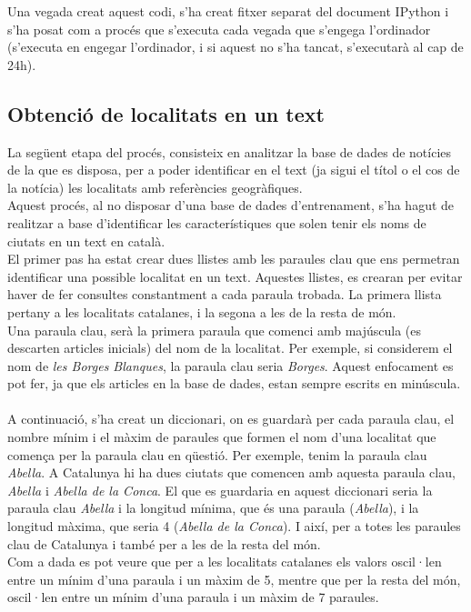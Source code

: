 \documentclass[12pt,a4paper,openright,oneside]{article}
\numberwithin{equation}{section}
\theoremstyle{definition}
\begin{document}
Una vegada creat aquest codi, s'ha creat fitxer separat del document IPython i s'ha posat com a procés que s'executa cada vegada que s'engega l'ordinador (s'executa en engegar l'ordinador, i si aquest no s'ha tancat, s'executarà al cap de 24h).

\subsection{Obtenció de localitats en un text}
La següent etapa del procés, consisteix en analitzar la base de dades de notícies de la que es disposa, per a poder identificar en el text (ja sigui el títol o el cos de la notícia) les localitats amb referències geogràfiques.\\
Aquest procés, al no disposar d'una base de dades d'entrenament, s'ha hagut de realitzar a base d'identificar les característiques que solen tenir els noms de ciutats en un text en català.\\
El primer pas ha estat crear dues llistes amb les paraules clau que ens permetran identificar una possible localitat en un text. Aquestes llistes, es crearan per evitar haver de fer consultes constantment a cada paraula trobada. La primera llista pertany a les localitats catalanes, i la segona a les de la resta de món.\\
Una paraula clau, serà la primera paraula que comenci amb majúscula (es descarten articles inicials) del nom de la localitat. Per exemple, si considerem el nom de \emph{les Borges Blanques}, la paraula clau seria \emph{Borges}. Aquest enfocament es pot fer, ja que els articles en la base de dades, estan sempre escrits en minúscula.\\\\
A continuació, s'ha creat un diccionari, on es guardarà per cada paraula clau, el nombre mínim i el màxim de paraules que formen el nom d'una localitat que comença per la paraula clau en qüestió. Per exemple, tenim la paraula clau \emph{Abella}. A Catalunya hi ha dues ciutats que comencen amb aquesta paraula clau, \emph{Abella} i \emph{Abella de la Conca}. El que es guardaria en aquest diccionari seria la paraula clau \emph{Abella} i la longitud mínima, que és una paraula (\emph{Abella}), i la longitud màxima, que seria 4 (\emph{Abella de la Conca}). I així, per a totes les paraules clau de Catalunya i també per a les de la resta del món.\\
Com a dada es pot veure que per a les localitats catalanes els valors oscil·len entre un mínim d'una paraula i un màxim de 5, mentre que per la resta del món, oscil·len entre un mínim d'una paraula i un màxim de 7 paraules.\\\\
\end{document}
